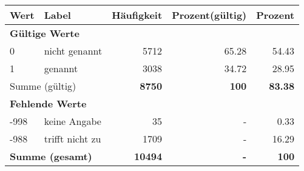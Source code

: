      \begin{longtable}{lXrrr}
     \toprule
     \textbf{Wert} & \textbf{Label} & \textbf{Häufigkeit} & \textbf{Prozent(gültig)} & \textbf{Prozent} \\
     \endhead
     \midrule
     \multicolumn{5}{l}{\textbf{Gültige Werte}}\\

     0 &
     \multicolumn{1}{X}{ nicht genannt   } &


       \num{5712} &
       \num[round-mode=places,round-precision=2]{65.28} &
         \num[round-mode=places,round-precision=2]{54.43} \\

     1 &
     \multicolumn{1}{X}{ genannt   } &


       \num{3038} &
       \num[round-mode=places,round-precision=2]{34.72} &
         \num[round-mode=places,round-precision=2]{28.95} \\
     \midrule
     \multicolumn{2}{l}{Summe (gültig)} &
       \textbf{\num{8750}} &
     \textbf{\num{100}} &
       \textbf{\num[round-mode=places,round-precision=2]{83.38}} \\
     \multicolumn{5}{l}{\textbf{Fehlende Werte}}\\
       -998 &
       keine Angabe &
         \num{35} &
        - &
         \num[round-mode=places,round-precision=2]{0.33} \\
       -988 &
       trifft nicht zu &
         \num{1709} &
        - &
         \num[round-mode=places,round-precision=2]{16.29} \\
     \midrule
     \multicolumn{2}{l}{\textbf{Summe (gesamt)}} &
          \textbf{\num{10494}} &
        \textbf{-} &
        \textbf{\num{100}} \\
     \bottomrule
     \end{longtable}
     
